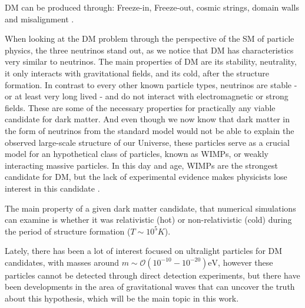 DM can be produced through: Freeze-in, Freeze-out, cosmic strings, domain walls and misalignment \cite{kolb}\cite{Marsh_2016}\cite{GONDOLO}\cite{Hall:2009bx}.

When looking at the DM problem through the perspective of the SM of particle physics, the three neutrinos stand out, as we notice that DM has characteristics very similar to neutrinos. The main properties of DM are its stability, neutrality, it only interacts with gravitational fields, and its cold, after the structure formation.
In contrast to every other known particle types, neutrinos are stable - or at least very long lived - and do not interact with electromagnetic or strong fields. These are some of the necessary properties for practically any viable candidate for dark matter\cite{STEIGMAN1985375}.
And even though we now know that dark matter in the form of neutrinos from the standard model would not be able to explain the observed large-scale structure of our Universe, these particles serve as a crucial model for an hypothetical class of particles, known as WIMPs, or weakly interacting massive particles. 
In this day and age, WIMPs are the strongest candidate for DM, but the lack of experimental evidence makes physicists lose interest in this candidate \cite{Moore_1999}\cite{10.1093/mnras/193.2.189}.

The main property of a given dark matter candidate, that numerical simulations can examine is whether it was relativistic (hot) or non-relativistic (cold) during the period of structure formation ($T\sim 10^5K$).

Lately, there has been a lot of interest focused on ultralight particles for DM candidates, with masses around $m\sim\mathcal{O}\left(10^{-10}-10^{-20}\right)\si{\eV}$,  
however these particles cannot be detected through direct detection experiments, but there have been developments in the area of gravitational waves that can uncover the truth about this hypothesis, which will be the main topic in this work.